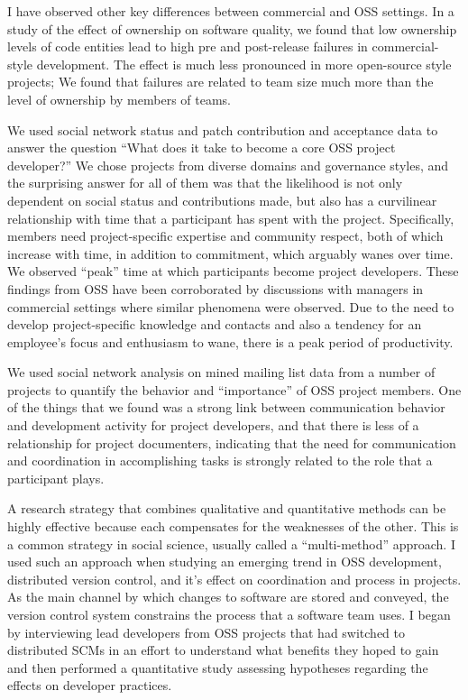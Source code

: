 \documentclass[10pt]{article}
\begin{document}
\begin{small}
I have observed other key differences between commercial and OSS settings.  In
a study of the effect of ownership on software quality, we found that low
ownership levels of code entities lead to high pre and post-release failures in
commercial-style development.  The effect is much less pronounced in more
open-source style projects; We found that failures are related to team size
much more than the level of ownership by members of teams.  

We used social network status and patch contribution and acceptance data to
answer the question ``What does it take to become a core OSS project
developer?'' We chose projects from diverse domains and governance styles, and
the surprising answer for all of them was that the likelihood is not only
dependent on social status and contributions made, but also has a curvilinear
relationship with time that a participant has spent with the project.
Specifically, members need project-specific expertise and community respect,
both of which increase with time, in addition to commitment, which arguably
wanes over time.  We observed ``peak'' time at which participants become
project developers.  These findings from OSS have been corroborated by
discussions with managers in commercial settings where similar phenomena were
observed.  Due to the need to develop project-specific knowledge and contacts
and also a tendency for an employee's focus and enthusiasm to wane, there is a
peak period of productivity.

We used social network analysis on mined mailing list data from a number of
projects to quantify the behavior and ``importance'' of OSS project members.
One of the things that we found was a strong link between communication
behavior and development activity for project developers, and that there is
less of a relationship for project documenters, indicating that the need for
communication and coordination in accomplishing tasks is strongly related to
the role that a participant plays.

A research strategy that combines qualitative and quantitative methods can be
highly effective because each compensates for the weaknesses of the other.
This is a common strategy in social science, usually called a ``multi-method''
approach.  I used such an approach when studying an emerging trend in
OSS development, distributed version control, and it's effect on coordination
and process in projects.  As the main channel by which changes to software are
stored and conveyed, the version control system constrains the process that a
software team uses.  I began by interviewing lead developers from OSS projects
that had switched to distributed SCMs in an effort to understand what benefits
they hoped to gain and then performed a quantitative study assessing hypotheses
regarding the effects on developer practices.


\end{small}
\end{document}
